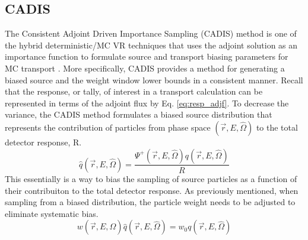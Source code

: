 \subsection{CADIS}
The Consistent Adjoint Driven Importance Sampling (CADIS) method is one of the
hybrid deterministic/MC VR
techniques that uses the adjoint solution as an importance function to 
formulate source and transport biasing parameters for MC transport \cite{cadis}.
More specifically, CADIS provides a method for generating
a biased source and the weight window lower bounds in a consistent manner.
Recall that the response, or tally, of interest in a transport calculation can be 
represented in terms of the adjoint flux by Eq. \ref{eq:resp_adjf}.
To decrease the variance, the CADIS method formulates a biased
source distribution that represents the contribution of particles from phase space
$(\overrightarrow{r}, E, \widehat{\Omega})$ 
to the total detector response, R.
\begin{equation} \label{eq:3.8}
	\widehat{q}(\overrightarrow{r}, E, \widehat{\Omega}) =
	\frac{\Psi^{+}(\overrightarrow{r}, E,\widehat{\Omega})
	q(\overrightarrow{r}, E, \widehat{\Omega})}{R}
\end{equation}
This essentially is a way to bias the sampling of source particles as a function of their 
contribuiton to the total detector response.
As previously mentioned, when sampling from a biased distribution, the particle weight
needs to be adjusted to eliminate systematic bias.  
\begin{equation} \label{eq:3.9}
	w(\overrightarrow{r}, E,
	\widehat{\Omega})\widehat{q}(\overrightarrow{r}, E, \widehat{\Omega})=
	w_{0}q(\overrightarrow{r}, E, \widehat{\Omega})
\end{equation}
